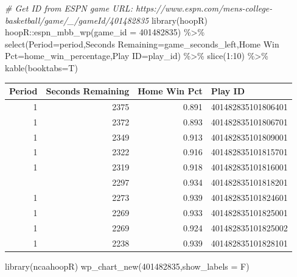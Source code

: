 \documentclass[
  11pt,
]{book}
\newenvironment{Shaded}{\begin{snugshade}}{\end{snugshade}}
\newcommand{\AttributeTok}[1]{\textcolor[rgb]{0.77,0.63,0.00}{#1}}
\newcommand{\CommentTok}[1]{\textcolor[rgb]{0.56,0.35,0.01}{\textit{#1}}}
\newcommand{\DecValTok}[1]{\textcolor[rgb]{0.00,0.00,0.81}{#1}}
\newcommand{\FunctionTok}[1]{\textcolor[rgb]{0.00,0.00,0.00}{#1}}
\newcommand{\NormalTok}[1]{#1}
\newcommand{\OtherTok}[1]{\textcolor[rgb]{0.56,0.35,0.01}{#1}}
\newcommand{\SpecialCharTok}[1]{\textcolor[rgb]{0.00,0.00,0.00}{#1}}
\newcommand{\StringTok}[1]{\textcolor[rgb]{0.31,0.60,0.02}{#1}}
\theoremstyle{definition}
\theoremstyle{definition}
\theoremstyle{definition}
\theoremstyle{definition}
\theoremstyle{remark}
\begin{document}
\begin{Shaded}
\begin{Highlighting}[]
\CommentTok{\# Get ID from ESPN game URL: https://www.espn.com/mens{-}college{-}basketball/game/\_/gameId/401482835}
\FunctionTok{library}\NormalTok{(hoopR)}
\NormalTok{hoopR}\SpecialCharTok{::}\FunctionTok{espn\_mbb\_wp}\NormalTok{(}\AttributeTok{game\_id =} \DecValTok{401482835}\NormalTok{) }\SpecialCharTok{\%\textgreater{}\%}
  \FunctionTok{select}\NormalTok{(}\AttributeTok{Period=}\NormalTok{period,}\StringTok{\textasciigrave{}}\AttributeTok{Seconds Remaining}\StringTok{\textasciigrave{}}\OtherTok{=}\NormalTok{game\_seconds\_left,}\StringTok{\textasciigrave{}}\AttributeTok{Home Win Pct}\StringTok{\textasciigrave{}}\OtherTok{=}\NormalTok{home\_win\_percentage,}\StringTok{\textasciigrave{}}\AttributeTok{Play ID}\StringTok{\textasciigrave{}}\OtherTok{=}\NormalTok{play\_id) }\SpecialCharTok{\%\textgreater{}\%}
  \FunctionTok{slice}\NormalTok{(}\DecValTok{1}\SpecialCharTok{:}\DecValTok{10}\NormalTok{) }\SpecialCharTok{\%\textgreater{}\%}
  \FunctionTok{kable}\NormalTok{(}\AttributeTok{booktabs=}\NormalTok{T)}
\end{Highlighting}
\end{Shaded}

\begin{tabular}{rrrl}
\toprule
Period & Seconds Remaining & Home Win Pct & Play ID\\
\midrule
1 & 2375 & 0.891 & 401482835101806401\\
1 & 2372 & 0.893 & 401482835101806701\\
1 & 2349 & 0.913 & 401482835101809001\\
1 & 2322 & 0.916 & 401482835101815701\\
1 & 2319 & 0.918 & 401482835101816001\\
\addlinespace
1 & 2297 & 0.934 & 401482835101818201\\
1 & 2273 & 0.939 & 401482835101824601\\
1 & 2269 & 0.933 & 401482835101825001\\
1 & 2269 & 0.924 & 401482835101825002\\
1 & 2238 & 0.939 & 401482835101828101\\
\bottomrule
\end{tabular}

\newpage

\begin{Shaded}
\begin{Highlighting}[]
\FunctionTok{library}\NormalTok{(ncaahoopR)}
\FunctionTok{wp\_chart\_new}\NormalTok{(}\DecValTok{401482835}\NormalTok{,}\AttributeTok{show\_labels =}\NormalTok{ F)}
\end{Highlighting}
\end{Shaded}
\end{document}
